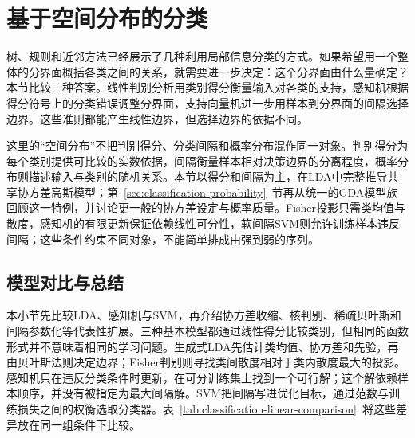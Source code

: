 \section{基于空间分布的分类}
\label{sec:classification-geometry}

树、规则和近邻方法已经展示了几种利用局部信息分类的方式。如果希望用一个整体的分界面概括各类之间的关系，就需要进一步决定：这个分界面由什么量确定？本节比较三种答案。线性判别分析用类别得分衡量输入对各类的支持，感知机根据得分符号上的分类错误调整分界面，支持向量机进一步用样本到分界面的间隔选择边界。这些准则都能产生线性边界，但选择边界的依据不同。

这里的“空间分布”不把判别得分、分类间隔和概率分布混作同一对象。判别得分为每个类别提供可比较的实数依据，间隔衡量样本相对决策边界的分离程度，概率分布则描述输入与类别的随机关系。本节以得分和间隔为主，在LDA中完整推导共享协方差高斯模型；第~\ref{sec:classification-probability}~节再从统一的GDA模型族回顾这一特例，并讨论更一般的协方差设定与概率质量。Fisher投影只需类均值与散度，感知机的有限更新保证依赖线性可分性，软间隔SVM则允许训练样本违反间隔；这些条件约束不同对象，不能简单排成由强到弱的序列。




\subsection{模型对比与总结}
\label{sec:classification-geometry-summary}

本小节先比较LDA、感知机与SVM，再介绍协方差收缩、核判别、稀疏贝叶斯和间隔参数化等代表性扩展。三种基本模型都通过线性得分比较类别，但相同的函数形式并不意味着相同的学习问题。生成式LDA先估计类均值、协方差和先验，再由贝叶斯法则决定边界；Fisher判别则寻找类间散度相对于类内散度最大的投影。感知机只在违反分类条件时更新，在可分训练集上找到一个可行解；这个解依赖样本顺序，并没有被指定为最大间隔解。SVM把间隔写进优化目标，通过范数与训练损失之间的权衡选取分类器。表~\ref{tab:classification-linear-comparison}~将这些差异放在同一组条件下比较。

